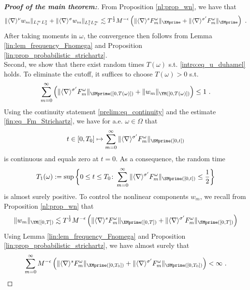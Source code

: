 \documentclass[11pt]{article}
\begin{document}
\begin{proof}[\textbf{Proof of the main theorem:}]
From Proposition \ref{nl:prop_wn}, we have that 
\begin{equation*}
\| \langle \nabla \rangle^{\nu} w_m \|_{L_t^\infty L_x^2} + \|\langle \nabla \rangle^{\sigma} w_m \|_{L_t^2 L_x^\infty} \lesssim
T^{\frac{1}{2}} M^{-\epsilon} \left( \| \langle \nabla \rangle^{s} F_m^\omega \|_{\XMprime} + \| \langle \nabla \rangle^{\sigma^\prime} F_m^\omega \|_{\SMprime} \right)~. 
\end{equation*}
After taking moments in \( \omega \), the convergence then follows from Lemma \ref{lin:lem_frequency_Fnomega}  and Proposition \ref{lin:prop_probabilistic_strichartz}. \\

Second, we show that there exist random times \( T(\omega) \) s.t. \eqref{intro:eq_u_duhamel} holds. To eliminate the cutoff, it suffices to choose \( T(\omega)>0 \) s.t.
\begin{equation*}
\sum_{m=0}^{\infty} \Big( \| \langle \nabla \rangle^{\sigma^\prime} F_{m}^\omega \|_{\SMprime([0,T(\omega)])} + \| w_m \|_{\YM([0,T(\omega)])} \Big)
\leq 1~. 
\end{equation*}
Using the continuity statement \eqref{prelim:eq_continuity} and the estimate \eqref{fin:eq_Fm_Strichartz}, we have for a.e. \( \omega \in \Omega \) that
\begin{equation*}
t \in [0,T_0] \mapsto \sum_{m=0}^\infty \| \langle \nabla \rangle^{\sigma^\prime} F_m^\omega \|_{\SMprime([0,t])} 
\end{equation*}
is continuous and equals zero at \( t= 0 \). As a consequence, the random time
\begin{equation*}
T_1(\omega) := \sup\bigg\{ 0 \leq t \leq T_0 \colon  \sum_{m=0}^\infty \| \langle \nabla \rangle^{\sigma^\prime} F_m^\omega \|_{\SMprime([0,t])}\leq \frac{1}{2} \bigg\} 
\end{equation*}
is almost surely positive. To control the nonlinear components \( w_m \), we recall from Proposition \ref{nl:prop_wn} that
\begin{equation*}
\| w_m \|_{\YM([0,T])}\lesssim T^{\frac{1}{2}} M^{-\epsilon} \left( \| \langle \nabla \rangle^s F_m^\omega \|_{\XMprime([0,T])}+ \| \langle \nabla \rangle^{\sigma^\prime} F_m^\omega \|_{\SMprime([0,T])}\right)
\end{equation*}
Using Lemma \ref{lin:lem_frequency_Fnomega} and Proposition \ref{lin:prop_probabilistic_strichartz}, we have almost surely that
\begin{equation*}
\sum_{m=0}^\infty M^{-\epsilon}  \left( \| \langle \nabla \rangle^s F_m^\omega \|_{\XMprime([0,T_0])}+ \| \langle \nabla \rangle^{\sigma^\prime} F_m^\omega \|_{\SMprime([0,T_0])}\right) < \infty~.

\end{equation*}
\end{proof}
\end{document}
